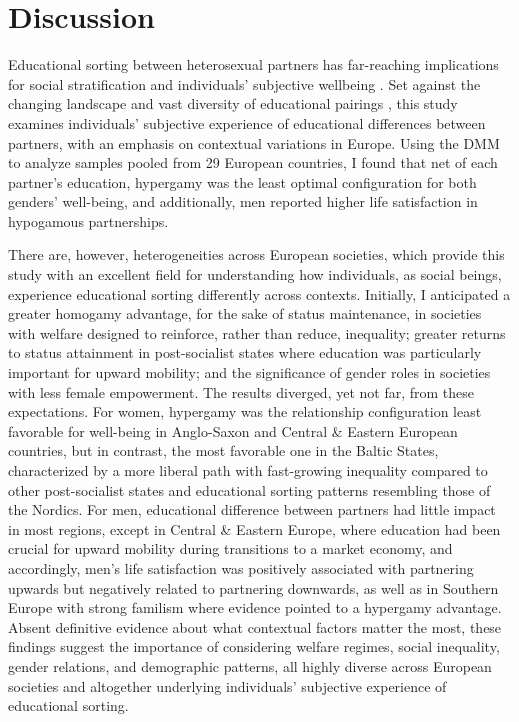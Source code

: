 \section{Discussion}
\label{sec:ch3-discussion}

Educational sorting between heterosexual partners has far-reaching implications for social stratification and individuals' subjective wellbeing \parencite{eikaEducationalAssortativeMating2019,keizerAreEqualsHappier2015,potarcaAreWomenHypogamous2022,zhaoPartnersEducationalPairings2022}. Set against the changing landscape and vast diversity of educational pairings \parencite{dehauwReversedGenderGap2017,eratEducationalAssortativeMating2021,esteveEndHypergamyGlobal2016}, this study examines individuals' subjective experience of educational differences between partners, with an emphasis on contextual variations in Europe. Using the DMM to analyze samples pooled from 29 European countries, I found that net of each partner's education, hypergamy was the least optimal configuration for both genders' well-being, and additionally, men reported higher life satisfaction in hypogamous partnerships.

There are, however, heterogeneities across European societies, which provide this study with an excellent field for understanding how individuals, as social beings, experience educational sorting differently across contexts. Initially, I anticipated a greater homogamy advantage, for the sake of status maintenance, in societies with welfare designed to reinforce, rather than reduce, inequality; greater returns to status attainment in post-socialist states where education was particularly important for upward mobility; and the significance of gender roles in societies with less female empowerment. The results diverged, yet not far, from these expectations. For women, hypergamy was the relationship configuration least favorable for well-being in Anglo-Saxon and Central \& Eastern European countries, but in contrast, the most favorable one in the Baltic States, characterized by a more liberal path with fast-growing inequality compared to other post-socialist states and educational sorting patterns resembling those of the Nordics. For men, educational difference between partners had little impact in most regions, except in Central \& Eastern Europe, where education had been crucial for upward mobility during transitions to a market economy, and accordingly, men's life satisfaction was positively associated with partnering upwards but negatively related to partnering downwards, as well as in Southern Europe with strong familism where evidence pointed to a hypergamy advantage. Absent definitive evidence about what contextual factors matter the most, these findings suggest the importance of considering welfare regimes, social inequality, gender relations, and demographic patterns, all highly diverse across European societies and altogether underlying individuals' subjective experience of educational sorting.


